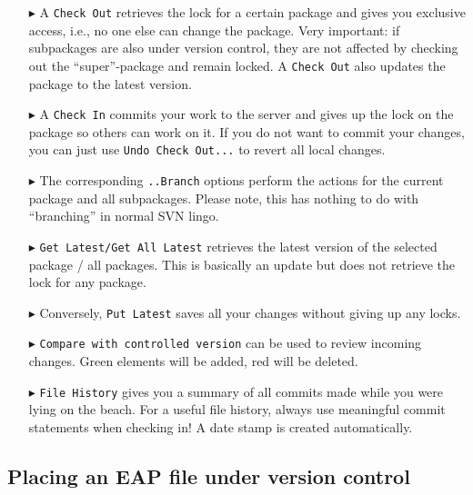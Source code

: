 \begin{enumerate}
  \item[$\blacktriangleright$] A \texttt{Check Out} retrieves the lock for a certain package and gives you exclusive access, i.e., no one else can change the package. 
  Very important: if subpackages are also under version control, they are not affected by checking out the ``super''-package and remain locked.
  A \texttt{Check Out} also updates the package to the latest version.

\item[$\blacktriangleright$] A \texttt{Check In} commits your work to the server and gives up the lock on the package so others can work on it.
If you do not want to commit your changes, you can just use \texttt{Undo Check Out...} to revert all local changes.

\item[$\blacktriangleright$]  The corresponding \texttt{..Branch} options perform the actions for the current package and all subpackages.
Please note, this has nothing to do with ``branching'' in normal SVN lingo.

\item[$\blacktriangleright$] \texttt{Get Latest/Get All Latest} retrieves the latest version of the selected package / all packages. 
This is basically an update but does not retrieve the lock for any package.

\item[$\blacktriangleright$] Conversely, \texttt{Put Latest} saves all your changes without giving up any locks.

\item[$\blacktriangleright$] \texttt{Compare with controlled version} can be used to review incoming changes. 
Green elements will be added, red will be deleted. 

\item[$\blacktriangleright$] \texttt{File History} gives you a summary of all commits made while you were lying on the beach. 
For a useful file history, always use meaningful commit statements when checking in! 
A date stamp is created automatically.
\end{enumerate}

\subsection{Placing an EAP file under version control}
\label{sect:appendixB_new_EAP_for_vc}

